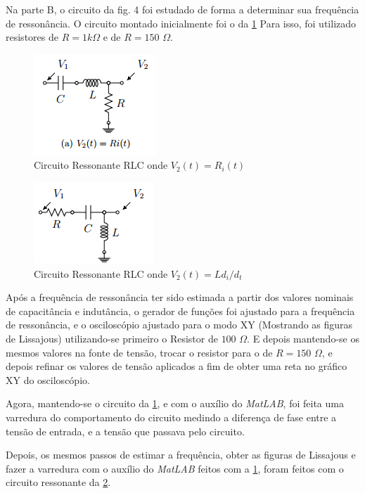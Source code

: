 \documentclass[11pt,a4paper]{article}
\begin{document}
Na parte B, o circuito da fig. 4 foi estudado de forma a determinar sua frequência de ressonância. O circuito montado inicialmente foi o da \cref{Parte2-1} Para isso, foi utilizado resistores de $R=1 k$$\Omega$ e de $R=150$ $\Omega$.

    \begin{figure}[!htb]
    \centering
    \includegraphics[scale=0.7]{Parte2-1.png}
    \caption{Circuito Ressonante RLC onde $V_2  (t) = R_i (t)$}
    \label{Parte2-1}
    \end{figure}
    
    \begin{figure}[!htb]
    \centering
    \includegraphics[scale=0.7]{Parte2-2.png}
    \caption{Circuito Ressonante RLC onde $V_2  (t) = L d_i/d_t$}
    \label{Parte2-2}
    \end{figure}

Após a frequência de ressonância ter sido estimada a partir dos valores nominais de capacitância e indutância, o gerador de funções foi ajustado para a frequência de ressonância, e o osciloscópio ajustado para o modo XY (Mostrando as figuras de Lissajous) utilizando-se primeiro o Resistor de $100$ $\Omega$. E depois mantendo-se os mesmos valores na fonte de tensão, trocar o resistor para o de $R=150$ $\Omega$, e depois refinar os valores de tensão aplicados a fim de obter uma reta no gráfico XY do osciloscópio.

Agora, mantendo-se o circuito da \cref{Parte2-1}, e com o auxílio do \textit{MatLAB}, foi feita uma varredura do comportamento do circuito medindo a diferença de fase entre a tensão de entrada, e a tensão que passava pelo circuito.

Depois, os mesmos passos de estimar a frequência, obter as figuras de Lissajous e fazer a varredura com o auxílio do \textit{MatLAB} feitos com a \cref{Parte2-1}, foram feitos com o circuito ressonante da \cref{Parte2-2}.\\
\end{document}
